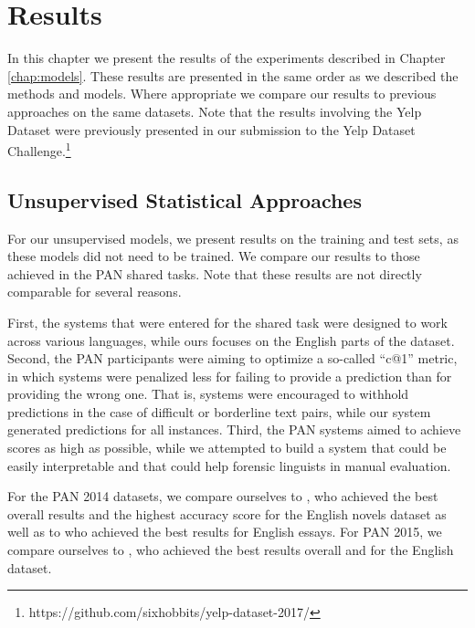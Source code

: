 \chapter{Results}
In this chapter we present the results of the experiments described in Chapter \ref{chap:models}. These results are presented in the same order as we described the methods and models. Where appropriate we compare our results to previous approaches on the same datasets. Note that the results involving the Yelp Dataset were previously presented in our submission to the Yelp Dataset Challenge.\footnote{https://github.com/sixhobbits/yelp-dataset-2017/} 

\section{Unsupervised Statistical Approaches}
\label{res:unsupervised}

\nocite{cappellato2014clef}

For our unsupervised models, we present results on the training and test sets, as these models did not need to be trained. We compare our results to those achieved in the PAN shared tasks. Note that these results are not directly comparable for several reasons. 

First, the systems that were entered for the shared task were designed to work across various languages, while ours focuses on the English parts of the dataset. Second, the PAN participants were aiming to optimize a so-called ``c@1'' metric, in which systems were penalized less for failing to provide a prediction than for providing the wrong one. That is, systems were encouraged to withhold predictions in the case of difficult or borderline text pairs, while our system generated predictions for all instances. Third, the PAN systems aimed to achieve scores as high as possible, while we attempted to build a system that could be easily interpretable and that could help forensic linguists in manual evaluation.

For the PAN 2014 datasets, we compare ourselves to \citet{khonji2014slightly}, 
who achieved the best overall results and the highest accuracy score for the English novels dataset as well as to \citet{frery2014identification} who achieved the best results for English essays. For PAN 2015, we compare ourselves to \citet{bagnall2015author}, who achieved the best results overall and for the English dataset.

